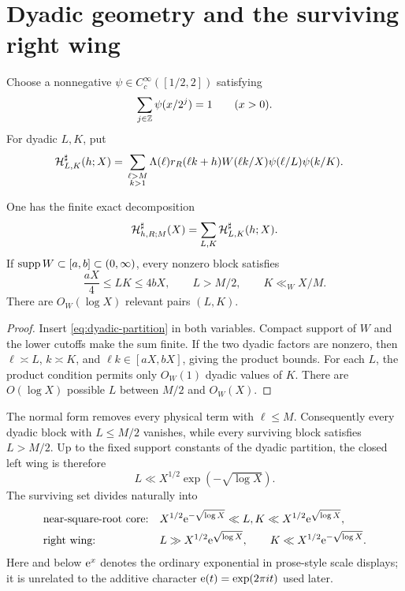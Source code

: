 \section{Dyadic geometry and the surviving right wing}
\label{sec:dyadic-corridor}

Choose a nonnegative $\psi\in C_c^\infty([1/2,2])$ satisfying
\begin{equation}
 \sum_{j\in\mathbb Z}\psi(x/2^j)=1
 \qquad(x>0).
 \label{eq:dyadic-partition}
\end{equation}
For dyadic $L,K$, put
\begin{align}
 \mathcal H^\sharp_{L,K}(h;X)
 ={}&\sum_{\substack{\ell>M\\k>1}}
 \Lambda(\ell)r_R(\ell k+h)W(\ell k/X)
 \psi(\ell/L)\psi(k/K).
 \label{eq:dyadic-Hsharp-block}
\end{align}

\begin{proposition}
\label{prop:dyadic-corridor}
One has the finite exact decomposition
\begin{equation}
 \mathcal H^\sharp_{h,R;M}(X)=
 \sum_{L,K}\mathcal H^\sharp_{L,K}(h;X).
 \label{eq:exact-dyadic-decomposition}
\end{equation}
If $\operatorname{supp} W\subset[a,b]\subset(0,\infty)$, every nonzero block satisfies
\begin{equation}
 \frac{aX}{4}\le LK\le4bX,
 \qquad L>M/2,
 \qquad K\ll_W X/M.
 \label{eq:dyadic-support-ledger}
\end{equation}
There are $O_W(\log X)$ relevant pairs $(L,K)$.
\end{proposition}

\begin{proof}
Insert \eqref{eq:dyadic-partition} in both variables.  Compact support of
$W$ and the lower cutoffs make the sum finite.  If the two dyadic factors
are nonzero, then $\ell\asymp L$, $k\asymp K$, and
$\ell k\in[aX,bX]$, giving the product bounds.  For each $L$, the product
condition permits only $O_W(1)$ dyadic values of $K$.  There are
$O(\log X)$ possible $L$ between $M/2$ and $O_W(X)$.
\end{proof}

The normal form removes every physical term with $\ell\le M$.
Consequently every dyadic block with $L\le M/2$ vanishes, while every
surviving block satisfies $L>M/2$.  Up to the fixed support constants of
the dyadic partition, the closed left wing is therefore
\begin{equation}
 L\ll X^{1/2}\exp(-\sqrt{\log X}).
 \label{eq:closed-left-wing}
\end{equation}
The surviving set divides naturally into
\begin{align}
 &\text{near-square-root core:}
 &&X^{1/2}\mathrm e^{-\sqrt{\log X}}
 \ll L,K\ll
 X^{1/2}\mathrm e^{\sqrt{\log X}},
 \label{eq:near-square-root-core}\\
 &\text{right wing:}
 &&L\gg X^{1/2}\mathrm e^{\sqrt{\log X}},
 \qquad
 K\ll X^{1/2}\mathrm e^{-\sqrt{\log X}}.
 \label{eq:right-wing}
\end{align}
Here and below $\mathrm e^x$ denotes the ordinary exponential in prose-style
scale displays; it is unrelated to the additive character
$\mathrm e(t)=\exp(2\pi it)$ used later.


